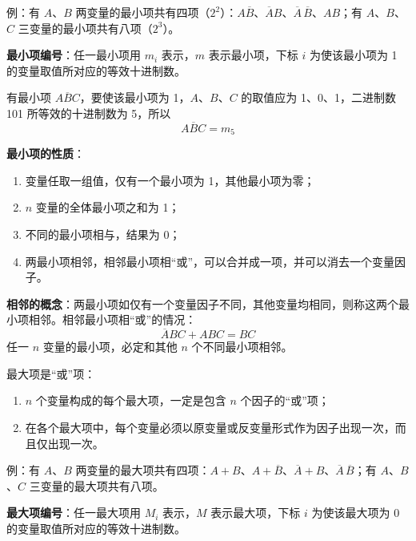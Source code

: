 例：有 $A$、$B$ 两变量的最小项共有四项（$2^2$）：$A\overline{B}$、$\overline{A}B$、$\overline{A}\,\overline{B}$、$AB$；有 $A$、$B$、$C$ 三变量的最小项共有八项（$2^3$）。

\textbf{最小项编号}：任一最小项用 $m_i$ 表示，$m$ 表示最小项，下标 $i$ 为使该最小项为 1 的变量取值所对应的等效十进制数。

\begin{example}[最小项编号]
\label{ex:最小项编号}
有最小项 $A\overline{B}C$，要使该最小项为 1，$A$、$B$、$C$ 的取值应为 1、0、1，二进制数 101 所等效的十进制数为 5，所以
\begin{equation}
	A\overline{B}C=m_5
	\label{eq:标准:最小项编号例}
\end{equation}
\end{example}

\textbf{最小项的性质}：
\begin{enumerate}
	\item 变量任取一组值，仅有一个最小项为 1，其他最小项为零；
	\item $n$ 变量的全体最小项之和为 1；
	\item 不同的最小项相与，结果为 0；
	\item 两最小项相邻，相邻最小项相“或”，可以合并成一项，并可以消去一个变量因子。
\end{enumerate}

\textbf{相邻的概念}：两最小项如仅有一个变量因子不同，其他变量均相同，则称这两个最小项相邻。相邻最小项相“或”的情况：
\begin{equation}
	\overline{A}BC+ABC=BC
	\label{eq:标准:相邻最小项合并}
\end{equation}
任一 $n$ 变量的最小项，必定和其他 $n$ 个不同最小项相邻。

\begin{definition}[最大项]
\label{def:最大项}
最大项是“或”项：
\begin{enumerate}
	\item $n$ 个变量构成的每个最大项，一定是包含 $n$ 个因子的“或”项；
	\item 在各个最大项中，每个变量必须以原变量或反变量形式作为因子出现一次，而且仅出现一次。
\end{enumerate}
\end{definition}

例：有 $A$、$B$ 两变量的最大项共有四项：$A+B$、$A+\overline{B}$、$\overline{A}+B$、$\overline{A}\,\overline{B}$；有 $A$、$B$、$C$ 三变量的最大项共有八项。

\textbf{最大项编号}：任一最大项用 $M_i$ 表示，$M$ 表示最大项，下标 $i$ 为使该最大项为 0 的变量取值所对应的等效十进制数。

